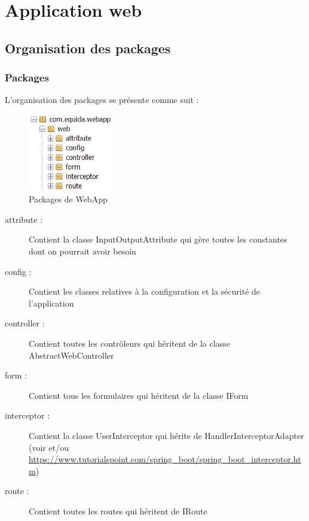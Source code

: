 \chapter{Application web}

	\section{Organisation des packages}

		\subsection{Packages}


			L'organisation des packages se présente comme suit :

			\begin{figure}[H]
				\centering\includegraphics[width=0.33\textwidth, keepaspectratio]{res/webapp-package.png}
				\caption{Packages de WebApp}
			\end{figure}

			\begin{description}
				\item[attribute :]{Contient la classe InputOutputAttribute qui gère toutes les constantes dont on pourrait avoir besoin}
				\item[config :]{Contient les classes relatives à la configuration et la sécurité de l'application}
				\item[controller :]{Contient toutes les contrôleurs qui héritent de la classe AbstractWebController}
				\item[form :]{Contient tous les formulaires qui héritent de la classe IForm}
				\item[interceptor :]{Contient la classe UserInterceptor qui hérite de HandlerInterceptorAdapter (voir  et/ou \url{https://www.tutorialspoint.com/spring_boot/spring_boot_interceptor.htm})}
				\item[route :]{Contient toutes les routes qui héritent de IRoute}
			\end{description}

